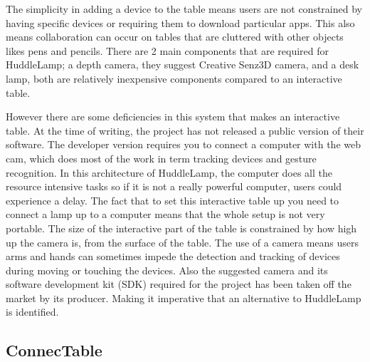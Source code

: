 The simplicity in adding a device to the table means users are not
constrained by having specific devices or requiring them to download
particular apps. This also means collaboration can occur on tables
that are cluttered with other objects likes pens and pencils. There
are 2 main components that are required for HuddleLamp;
a depth camera, they suggest Creative Senz3D\cite{creative-senz3d} camera, and a desk lamp, both
are relatively inexpensive components compared to an interactive table.

However there are some deficiencies in this system that makes
an interactive table. At the time of writing, the project has not
released a public version of their software. The developer
version requires you to connect a computer with the web cam, which
does most of the work in term tracking devices and gesture recognition. In this architecture
of HuddleLamp, the computer does all the resource intensive tasks so if it is
not a really powerful computer, users could experience a delay. The fact
that to set this interactive table up you need to connect a lamp up
to a computer means that the whole setup is not very portable. The
size of the interactive part of the table is constrained by how high
up the camera is, from the surface of the table. The use of a camera
means users arms and hands can sometimes impede the
detection and tracking of devices during moving or touching the devices.
Also the suggested camera and its software development kit (SDK) required
for the project has been taken off the market by its producer. Making
it imperative that an alternative to HuddleLamp is identified.

\subsection{ConnecTable}

